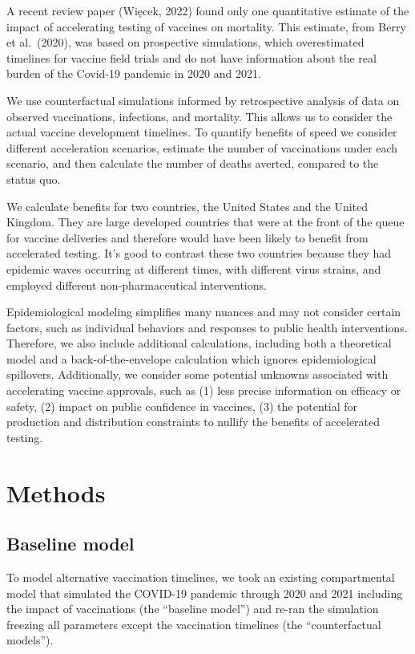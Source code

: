 \documentclass{article}
\begin{document}
A recent review paper (Więcek, 2022) found only one quantitative estimate of the impact of accelerating testing of vaccines on mortality. This estimate, from Berry et al.~(2020), was based on prospective simulations, which overestimated timelines for vaccine field trials and do not have information about the real burden of the Covid-19 pandemic in 2020 and 2021.

We use counterfactual simulations informed by retrospective analysis of data on observed vaccinations, infections, and mortality. This allows us to consider the actual vaccine development timelines. To quantify benefits of speed we consider different acceleration scenarios, estimate the number of vaccinations under each scenario, and then calculate the number of deaths averted, compared to the status quo.

We calculate benefits for two countries, the United States and the United Kingdom. They are large developed countries that were at the front of the queue for vaccine deliveries and therefore would have been likely to benefit from accelerated testing. It's good to contrast these two countries because they had epidemic waves occurring at different times, with different virus strains, and employed different non-pharmaceutical interventions.

Epidemiological modeling simplifies many nuances and may not consider certain factors, such as individual behaviors and responses to public health interventions. Therefore, we also include additional calculations, including both a theoretical model and a back-of-the-envelope calculation which ignores epidemiological spillovers. Additionally, we consider some potential unknowns associated with accelerating vaccine approvals, such as (1) less precise information on efficacy or safety, (2) impact on public confidence in vaccines, (3) the potential for production and distribution constraints to nullify the benefits of accelerated testing.

\hypertarget{methods}{%
\section{Methods}\label{methods}}

\hypertarget{baseline-model}{%
\subsection{Baseline model}\label{baseline-model}}

To model alternative vaccination timelines, we took an existing compartmental model that simulated the COVID-19 pandemic through 2020 and 2021 including the impact of vaccinations (the ``baseline model'') and re-ran the simulation freezing all parameters except the vaccination timelines (the ``counterfactual models'').
\end{document}
